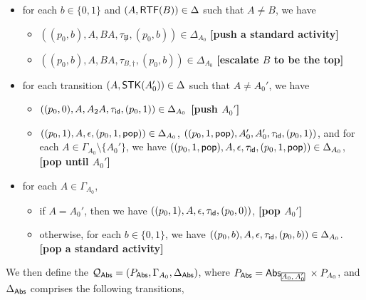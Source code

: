 {{\begin{itemize}
\begin{itemize}
            \item $((p_0,1), A_0', BA_0', \tau_{\not B}, (p_0,1)) \in \Delta_{A_0}$, \textbf{[push a standard activity]}
            \item $((p_0,1), A_0', \varepsilon, \tau_{B}, (\langle B,\CTP\rangle,0)) \in \Delta_{A_0}$, 
        $((\langle B, \CTP\rangle,0), B, B, \tau_{id}, (p_0,0))  \in \Delta_{A_0}$, and for each $A' \in \Gamma_{A_0} \setminus \{B,A_0'\}$, $((\langle B, \CTP\rangle,0), A', \varepsilon, \tau_{\id}, (\langle B, \CTP\rangle,0)) \in \Delta_{A_0}$, \textbf{[pop until $B$]}
        \end{itemize}
    \item for each $b\in\{0,1\}$ and $(A, \mathsf{RTF}(B)) \in \Delta$ such that $A \neq B$, we have 
        \begin{itemize}
            \item $((p_0,b), A, BA, \tau_{\not B}, (p_0,b)) \in \Delta_{A_0}$ \textbf{[push a standard activity]}
            \item $((p_0,b), A, BA, \tau_{B, \dag}, (p_0,b)) \in \Delta_{A_0}$ \textbf{[escalate $B$ to be the top]}
        \end{itemize}
    \item for each transition $(A,\mathsf{STK}(A_0'))\in\Delta$ such that $A\neq A_0'$, we have 
        \begin{itemize}
            \item $((p_0,0),A,A_2A,\tau_{\mathsf{id}},(p_0,1))\in\Delta_{A_0}$ \textbf{[push $A_0'$]}
            \item $((p_0,1),A,\epsilon,(p_0,1,\mathsf{pop}))\in\Delta_{A_0}$, $((p_0,1,\mathsf{pop}),A_0',A_0',\tau_{\mathsf{id}},(p_0,1))$, and for each $A\in\Gamma_{A_0}\setminus\{A_0'\}$, we have $((p_0,1,\mathsf{pop}),A,\epsilon,\tau_{\mathsf{id}},(p_0,1,\mathsf{pop}))\in\Delta_{A_0}$, \textbf{[pop until $A_0'$]}
        \end{itemize}
    \item for each $A\in\Gamma_{A_0}$, 
        \begin{itemize}
            \item if $A=A_0'$, then we have $((p_0,1),A,\epsilon,\tau_{\mathsf{id}},(p_0,0))$, \textbf{[pop $A_0'$]}
            \item otherwise, for each $b\in\{0,1\}$, we have $((p_0,b),A,\epsilon,\tau_{\mathsf{id}},(p_0,b))\in\Delta_{A_0}$. \textbf{[pop a standard activity]}
        \end{itemize}
\end{itemize}
}
We then define the {\WOTrPDS} ${\mathcal{Q} }_{{\mathsf{Abs} }} = (P_{{\mathsf{Abs} }},\Gamma_{A_0},\Delta_{{\mathsf{Abs} }})$, where $P_{\abs} = \abs_{\mhcancel{A_0,A_0'}}\times P_{A_0}$, and $\Delta_{{\mathsf{Abs} }}$ comprises the following transitions,
}
